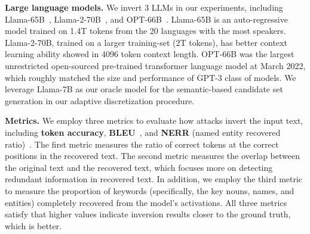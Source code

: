 \noindent \textbf{Large language models.}
We invert 3 LLMs in our experiments, including Llama-65B~\cite{llama}, Llama-2-70B~\cite{llama2}, and OPT-66B~\cite{opt}. Llama-65B is an auto-regressive model trained on 1.4T tokens from the 20 languages with the most speakers. Llama-2-70B, trained on a larger training-set (2T tokens), has better context learning ability showed in 4096 token context length. OPT-66B was the largest unrestricted open-sourced pre-trained transformer language model at March 2022, which roughly matched the size and performance of GPT-3 class of models.
We leverage Llama-7B as our oracle model for the semantic-based candidate set generation in our adaptive discretization procedure. 



\noindent \textbf{Metrics. }
We employ three metrics to evaluate how attacks invert the input text, including \textbf{token accuracy}, \textbf{BLEU}~\cite{bleu}, and \textbf{NERR} (named entity recovered ratio)~\cite{nerr}. The first metric measures the ratio of correct tokens at the correct positions in the recovered text. The second metric measures the overlap between the original text and the recovered text, which focuses more on detecting redundant information in recovered text. In addition, we employ the third metric to measure the proportion of keywords (specifically, the key nouns, names, and entities) completely recovered from the model's activations. All three metrics satisfy that higher values indicate inversion results closer to the ground truth, which is better. 



